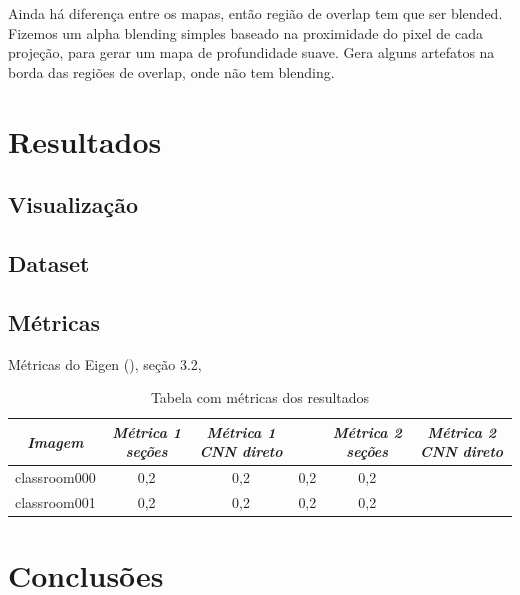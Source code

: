 \documentclass[cic,tc]{iiufrgs}
\begin{document}
Ainda há diferença entre os mapas, então região de overlap tem que ser blended. Fizemos um alpha blending simples baseado na proximidade do pixel de cada projeção, para gerar um mapa de profundidade suave. Gera alguns artefatos na borda das regiões de overlap, onde não tem blending.

\chapter{Resultados}

\section{Visualização}


\section{Dataset}

\section{Métricas}

Métricas do Eigen (\citep{Eigen2014}), seção 3.2, 

\begin{table}[h]
    \caption{Tabela com métricas dos resultados}
    \centering
        \begin{tabular}{c|c|c|c|c|c}
          \hline
          \textit{Imagem} & \textit{Métrica 1 seções} & \textit{Métrica 1 CNN direto} &  & \textit{Métrica 2 seções} & \textit{Métrica 2 CNN direto} \\
          \hline
          \hline
          classroom000  &  0,2  &  0,2  &  0,2  &  0,2  \\
          classroom001  &  0,2  &  0,2  &  0,2  &  0,2  \\
          \hline
        \end{tabular}
    \label{tbl:results1}
\end{table}


\chapter{Conclusões}



\end{document}
